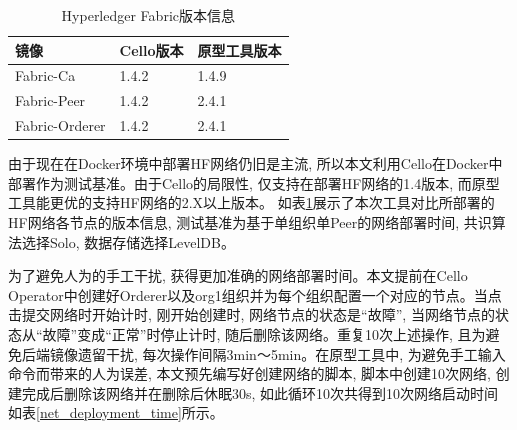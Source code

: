 

{\footnotesize
\begin{longtable}[h]{m{100pt} m{100pt} m{100pt}}
    \caption[Hyperledger Fabric版本信息]{Hyperledger Fabric版本信息} \label{test_fabric_net} \\
        \hline  
        \textbf{镜像}&\textbf{Cello版本}&\textbf{原型工具版本}\\
        \hline
        Fabric-Ca & 1.4.2 & 1.4.9 \\
        Fabric-Peer & 1.4.2 & 2.4.1 \\
        Fabric-Orderer & 1.4.2 & 2.4.1 \\
        \hline
    \end{longtable}
}

由于现在在Docker环境中部署HF网络仍旧是主流, 所以本文利用Cello在Docker中部署作为测试基准。由于Cello的局限性, 仅支持在部署HF网络的1.4版本, 而原型工具能更优的支持HF网络的2.X以上版本。
如表\ref{test_fabric_net}展示了本次工具对比所部署的HF网络各节点的版本信息, 测试基准为基于单组织单Peer的网络部署时间, 共识算法选择Solo, 数据存储选择LevelDB。


为了避免人为的手工干扰, 获得更加准确的网络部署时间。本文提前在Cello Operator中创建好Orderer以及org1组织并为每个组织配置一个对应的节点。当点击提交网络时开始计时, 刚开始创建时, 网络节点的状态是“故障”, 当网络节点的状态从“故障”变成“正常”时停止计时, 随后删除该网络。重复10次上述操作, 且为避免后端镜像遗留干扰, 每次操作间隔3min～5min。在原型工具中, 为避免手工输入命令而带来的人为误差, 本文预先编写好创建网络的脚本, 脚本中创建10次网络, 创建完成后删除该网络并在删除后休眠30s, 如此循环10次共得到10次网络启动时间如表\ref{net_deployment_time}所示。

